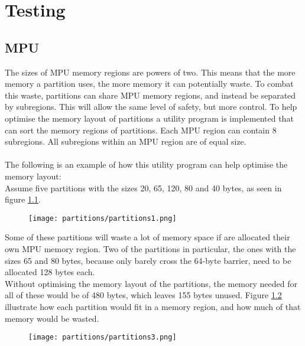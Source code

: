 \chapter{Testing}

\section{MPU}
The sizes of MPU memory regions are powers of two. This means that the more
memory a partition uses, the more memory it can potentially waste. To combat
this waste, partitions can share MPU memory regions, and instead be separated
by subregions. This will allow the same level of safety, but more control.
To help optimise the memory layout of partitions a utility program is implemented
that can sort the memory regions of partitions. Each MPU region can contain 8
subregions. All subregions within an MPU region are of equal size.
\\\\
The following is an example of how this utility program can help optimise the 
memory layout:
\\


Assume five partitions with the sizes 20, 65, 120, 80 and 40 bytes, as seen in figure \ref{fig:ce2}.\\

\begin{figure}[H]
\centering
\texttt{[image: partitions/partitions1.png]}
\label{fig:ce2}
\end{figure}

Some of these partitions will waste a lot of memory space if are allocated their
own MPU memory region. Two of the partitions in particular, the ones with the sizes
65 and 80 bytes, because only barely cross the 64-byte barrier, need to be
allocated 128 bytes each.\\
Without optimising the memory layout of the partitions, the memory needed for
all of these would be of 480 bytes, which leaves 155 bytes unused. Figure 
\ref{fig:ce3} illustrate how each partition would fit in a memory region, and how
much of that memory would be wasted.\\
\begin{figure}[H]
\centering
\texttt{[image: partitions/partitions3.png]}
\label{fig:ce3}
\end{figure}

